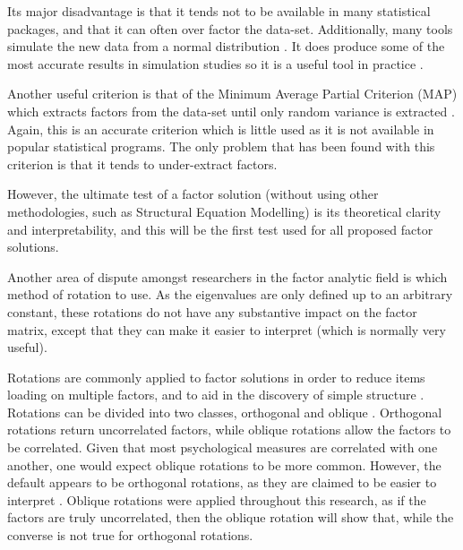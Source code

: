 Its major disadvantage is that it tends not to be available in many statistical packages, and that it can often over factor the data-set. Additionally, many tools simulate the new data from a normal distribution \cite{micceri1989unicorn}.  It does produce some of the most accurate results in simulation studies so it is a useful tool in practice \cite{zwick1986comparison}. 

Another useful criterion is that of the Minimum Average Partial Criterion (MAP) which extracts factors from the data-set until only random variance is extracted \cite{revelle1979very}. Again, this is an accurate criterion  \cite{zwick1986comparison} which is little used as it is not available in popular statistical programs. The only problem that  has been found with this criterion is that it tends to under-extract factors. %

However, the ultimate test of a factor solution (without using other methodologies, such as Structural Equation Modelling) \cite{joreskog1978structural} is its theoretical clarity and interpretability, and this will be the first test used for all proposed factor solutions.

Another area of dispute amongst researchers in the factor analytic field is which method of rotation to use\cite{sass2010comparative}. As the eigenvalues are only defined up to an arbitrary constant, these rotations do not have any substantive impact on the factor matrix, except that they can make it easier to interpret (which is normally very useful). 

Rotations are commonly applied to factor solutions in order to reduce items loading on multiple factors, and to aid in the discovery of simple structure \cite{henson2006use}. Rotations can be divided into two classes, orthogonal and oblique \cite{sass2010comparative}. Orthogonal rotations return uncorrelated factors, while oblique rotations allow the factors to be correlated. Given that most psychological measures are correlated with one another, one would expect oblique rotations to be more common. However, the default appears to be orthogonal rotations, as they are claimed to be easier to interpret \cite{henson2006use}. Oblique rotations were applied throughout this research, as if the factors are truly uncorrelated, then the oblique rotation will show that, while the converse is not true for orthogonal rotations.

